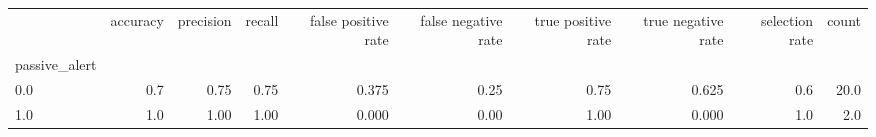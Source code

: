 \begin{tabular}{lrrrrrrrrr}
\toprule
{} &  accuracy &  precision &  recall &  false positive rate &  false negative rate &  true positive rate &  true negative rate &  selection rate &  count \\
passive\_alert &           &            &         &                      &                      &                     &                     &                 &        \\
\midrule
0.0           &       0.7 &       0.75 &    0.75 &                0.375 &                 0.25 &                0.75 &               0.625 &             0.6 &   20.0 \\
1.0           &       1.0 &       1.00 &    1.00 &                0.000 &                 0.00 &                1.00 &               0.000 &             1.0 &    2.0 \\
\bottomrule
\end{tabular}
